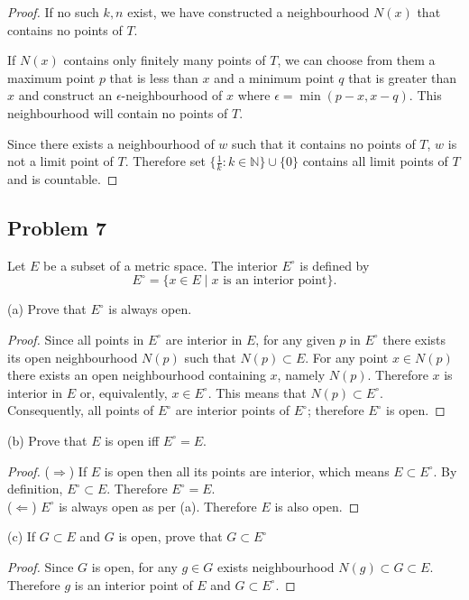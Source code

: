 \documentclass{article}
\begin{document}
\begin{proof}
If no such $k, n$ exist, we have constructed a neighbourhood $N(x)$ that contains no points of $T$. 

If $N(x)$ contains only finitely many points of $T$, we can choose from them a maximum point $p$ that is less than $x$ and a minimum point $q$ that is greater than $x$ and construct an $\epsilon$-neighbourhood of $x$ where $\epsilon = \min(p-x, x-q)$. This neighbourhood will contain no points of $T$.

Since there exists a neighbourhood of $w$ such that it contains no points of $T$, $w$ is not a limit point of $T$. Therefore set $\{ \frac{1}{k} : k \in \mathbb{N} \} \cup \{0\}$ contains all limit points of $T$ and is countable.

\end{proof}


\subsection*{Problem 7}

\begin{tcolorbox}
Let $E$ be a subset of a metric space. The interior $E^\circ$ is defined by
$$E^\circ = \{x \in E \mid x \text{ is an interior point} \}.$$

(a) Prove that $E^\circ$ is always open.
\end{tcolorbox}

\begin{proof}
Since all points in $E^\circ$ are interior in $E$, for any given $p$ in $E^\circ$ there exists its open neighbourhood $N(p)$ such that $N(p) \subset E$. For any point $x \in N(p)$ there exists an open neighbourhood containing $x$, namely $N(p)$. Therefore $x$ is interior in $E$ or, equivalently, $x \in E^\circ$. This means that $N(p) \subset E^\circ$. Consequently, all points of $E^\circ$ are interior points of $E^\circ$; therefore $E^\circ$ is open.
\end{proof}

\begin{tcolorbox}
(b) Prove that $E$ is open iff $E^\circ = E$.
\end{tcolorbox}

\begin{proof}
($\Rightarrow$) If $E$ is open then all its points are interior, which means $E \subset E^\circ$. By definition, $E^\circ \subset E$. Therefore $E^\circ = E$.
\\
($\Leftarrow$) $E^\circ$ is always open as per (a). Therefore $E$ is also open.
\end{proof}

\begin{tcolorbox}
(c) If $G \subset E$ and $G$ is open, prove that $G \subset E^\circ$
\end{tcolorbox}

\begin{proof}
Since $G$ is open, for any $g \in G$ exists neighbourhood $N(g) \subset G \subset E$. Therefore $g$ is an interior point of $E$ and $G \subset E^\circ$.
\end{proof}
\end{document}
